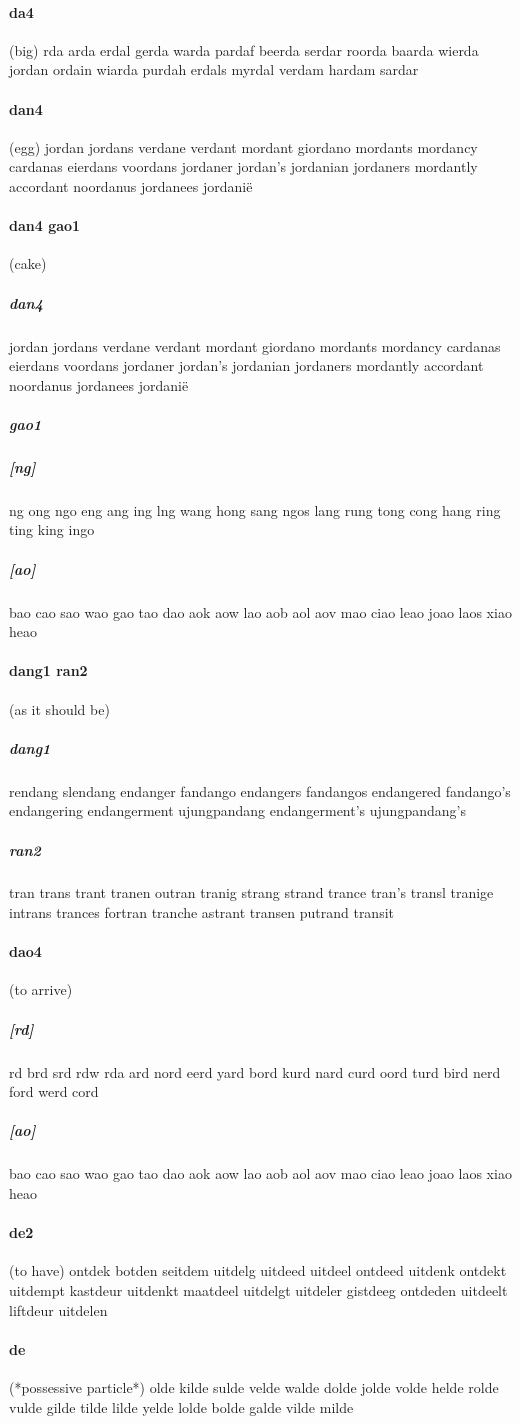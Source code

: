 \documentclass{article}
\begin{document}
\paragraph{da4}(big) rda
arda
erdal
gerda
warda
pardaf
beerda
serdar
roorda
baarda
wierda
jordan
ordain
wiarda
purdah
erdals
myrdal
verdam
hardam
sardar
\paragraph{dan4}(egg) jordan
jordans
verdane
verdant
mordant
giordano
mordants
mordancy
cardanas
eierdans
voordans
jordaner
jordan's
jordanian
jordaners
mordantly
accordant
noordanus
jordanees
jordanië
\paragraph{dan4 gao1}(cake) \subparagraph{dan4}jordan
jordans
verdane
verdant
mordant
giordano
mordants
mordancy
cardanas
eierdans
voordans
jordaner
jordan's
jordanian
jordaners
mordantly
accordant
noordanus
jordanees
jordanië
\subparagraph{gao1}\subparagraph{[ng]}ng
ong
ngo
eng
ang
ing
lng
wang
hong
sang
ngos
lang
rung
tong
cong
hang
ring
ting
king
ingo
\subparagraph{[ao]}bao
cao
sao
wao
gao
tao
dao
aok
aow
lao
aob
aol
aov
mao
ciao
leao
joao
laos
xiao
heao
\paragraph{dang1 ran2}(as it should be) \subparagraph{dang1}rendang
slendang
endanger
fandango
endangers
fandangos
endangered
fandango's
endangering
endangerment
ujungpandang
endangerment's
ujungpandang's
\subparagraph{ran2}tran
trans
trant
tranen
outran
tranig
strang
strand
trance
tran's
transl
tranige
intrans
trances
fortran
tranche
astrant
transen
putrand
transit
\paragraph{dao4}(to arrive) \subparagraph{[rd]}rd
brd
srd
rdw
rda
ard
nord
eerd
yard
bord
kurd
nard
curd
oord
turd
bird
nerd
ford
werd
cord
\subparagraph{[ao]}bao
cao
sao
wao
gao
tao
dao
aok
aow
lao
aob
aol
aov
mao
ciao
leao
joao
laos
xiao
heao
\paragraph{de2}(to have) ontdek
botden
seitdem
uitdelg
uitdeed
uitdeel
ontdeed
uitdenk
ontdekt
uitdempt
kastdeur
uitdenkt
maatdeel
uitdelgt
uitdeler
gistdeeg
ontdeden
uitdeelt
liftdeur
uitdelen
\paragraph{de}(*possessive particle*) olde
kilde
sulde
velde
walde
dolde
jolde
volde
helde
rolde
vulde
gilde
tilde
lilde
yelde
lolde
bolde
galde
vilde
milde
\end{document}
